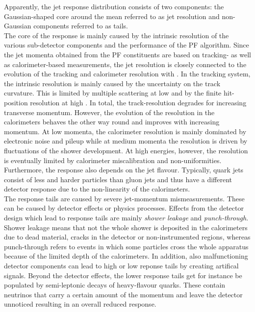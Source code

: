 Apparently, the jet response distribution consists of two components: the Gaussian-shaped core around the mean referred to as jet resolution and non-Gaussian components referred to as tails. \\
The core of the response is mainly caused by the intrinsic resolution of the various sub-detector components and the performance of the PF algorithm. Since the jet momenta obtained from the PF constituents are based on tracking- as well as calorimeter-based measurements, the jet resolution is closely connected to the evolution of the tracking and calorimeter resolution with \pt. In the tracking system, the intrinsic resolution is mainly caused by the uncertainty on the track curvature. This is limited by multiple scattering at low \pt and by the finite hit-position resolution at high \pt. In total, the track-\pt resolution degrades for increasing transverse momentum. However, the evolution of the resolution in the calorimeters behaves the other way round and improves with increasing momentum. At low momenta, the calorimeter resolution is mainly dominated by electronic noise and pileup while at medium momenta the resolution is driven by fluctuations of the shower development. At high energies, however, the resolution is eventually limited by calorimeter miscalibration and non-uniformities. Furthermore, the response also depends on the jet flavour. Typically, quark jets consist of less and harder particles than gluon jets and thus have a different detector response due to the non-linearity of the calorimeters.  \\
The response tails are caused by severe jet-momentum mismeasurements. These can be caused by detector effects or physics processes. Effects from the detector design which lead to response tails are mainly \textit{shower leakage} and \textit{punch-through}. Shower leakage means that not the whole shower is deposited in the calorimeters due to dead material, cracks in the detector or non-instrumented regions, whereas punch-through refers to events in which some particles cross the whole apparatus because of the limited depth of the calorimeters. In addition, also malfunctioning detector components can lead to high or low reponse tails by creating artifical signals. Beyond the detector effects, the lower response tails get for instance be populated by semi-leptonic decays of heavy-flavour quarks. These contain neutrinos that carry a certain amount of the momentum and leave the detector unnoticed resulting in an overall reduced response. 

